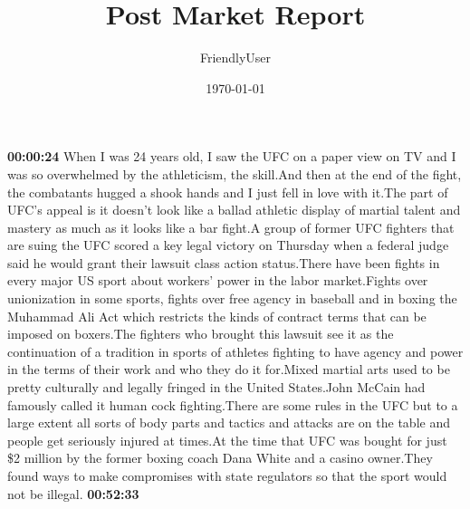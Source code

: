 \documentclass{article}%
\title{Post Market Report}%
\author{FriendlyUser}%
\date{\today}%
\begin{document}
%
\normalsize%
\textbf{00:00:24}%
\newline%
When I was 24 years old, I saw the UFC on a paper view on TV and I was so overwhelmed by the athleticism, the skill.And then at the end of the fight, the combatants hugged a shook hands and I just fell in love with it.The part of UFC's appeal is it doesn't look like a ballad athletic display of martial talent and mastery as much as it looks like a bar fight.A group of former UFC fighters that are suing the UFC scored a key legal victory on Thursday when a federal judge said he would grant their lawsuit class action status.There have been fights in every major US sport about workers' power in the labor market.Fights over unionization in some sports, fights over free agency in baseball and in boxing the Muhammad Ali Act which restricts the kinds of contract terms that can be imposed on boxers.The fighters who brought this lawsuit see it as the continuation of a tradition in sports of athletes fighting to have agency and power in the terms of their work and who they do it for.Mixed martial arts used to be pretty culturally and legally fringed in the United States.John McCain had famously called it human cock fighting.There are some rules in the UFC but to a large extent all sorts of body parts and tactics and attacks are on the table and people get seriously injured at times.At the time that UFC was bought for just \$2 million by the former boxing coach Dana White and a casino owner.They found ways to make compromises with state regulators so that the sport would not be illegal.%
\textbf{00:52:33}%
\newline%
\end{document}
